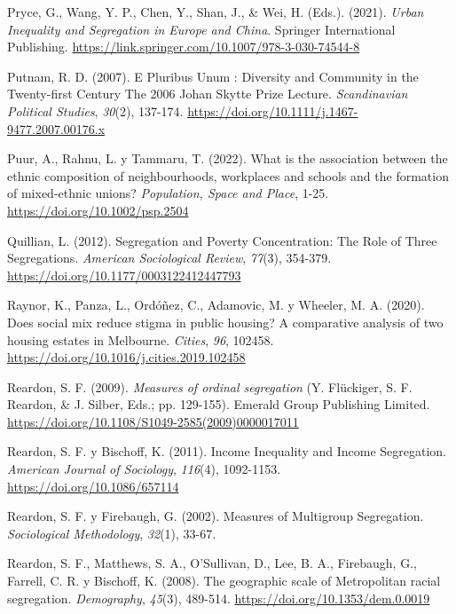 \documentclass[
  spanish,
  a4paper,%
  chapterprefix=true,%
  DIV=calc,%
  twoside]{scrbook}%
\newlength{\cslhangindent}
\newenvironment{CSLReferences}[2] %
 {\begin{list}{}{%
  \setlength{\itemindent}{0pt}
  \setlength{\leftmargin}{0pt}
  \setlength{\parsep}{0pt}
  \ifodd #1
   \setlength{\leftmargin}{\cslhangindent}
   \setlength{\itemindent}{-1\cslhangindent}
  \fi
  \setlength{\itemsep}{#2\baselineskip}}}
 {\end{list}}
\begin{document}
\begin{CSLReferences}{1}{0}
Pryce, G., Wang, Y. P., Chen, Y., Shan, J., \& Wei, H. (Eds.). (2021). \emph{Urban Inequality and Segregation in Europe and China}. Springer International Publishing. \url{https://link.springer.com/10.1007/978-3-030-74544-8}

Putnam, R. D. (2007). E Pluribus Unum : Diversity and Community in the Twenty-first Century The 2006 Johan Skytte Prize Lecture. \emph{Scandinavian Political Studies}, \emph{30}(2), 137-174. \url{https://doi.org/10.1111/j.1467-9477.2007.00176.x}

Puur, A., Rahnu, L. y Tammaru, T. (2022). What is the association between the ethnic composition of neighbourhoods, workplaces and schools and the formation of mixed-ethnic unions? \emph{Population, Space and Place}, 1-25. \url{https://doi.org/10.1002/psp.2504}

Quillian, L. (2012). Segregation and Poverty Concentration: The Role of Three Segregations. \emph{American Sociological Review}, \emph{77}(3), 354-379. \url{https://doi.org/10.1177/0003122412447793}

Raynor, K., Panza, L., Ordóñez, C., Adamovic, M. y Wheeler, M. A. (2020). Does social mix reduce stigma in public housing? A comparative analysis of two housing estates in Melbourne. \emph{Cities}, \emph{96}, 102458. \url{https://doi.org/10.1016/j.cities.2019.102458}

Reardon, S. F. (2009). \emph{Measures of ordinal segregation} (Y. Flückiger, S. F. Reardon, \& J. Silber, Eds.; pp. 129-155). Emerald Group Publishing Limited. \url{https://doi.org/10.1108/S1049-2585(2009)0000017011}

Reardon, S. F. y Bischoff, K. (2011). Income Inequality and Income Segregation. \emph{American Journal of Sociology}, \emph{116}(4), 1092-1153. \url{https://doi.org/10.1086/657114}

Reardon, S. F. y Firebaugh, G. (2002). Measures of Multigroup Segregation. \emph{Sociological Methodology}, \emph{32}(1), 33-67.

Reardon, S. F., Matthews, S. A., O'Sullivan, D., Lee, B. A., Firebaugh, G., Farrell, C. R. y Bischoff, K. (2008). The geographic scale of Metropolitan racial segregation. \emph{Demography}, \emph{45}(3), 489-514. \url{https://doi.org/10.1353/dem.0.0019}


\end{CSLReferences}
\end{document}
